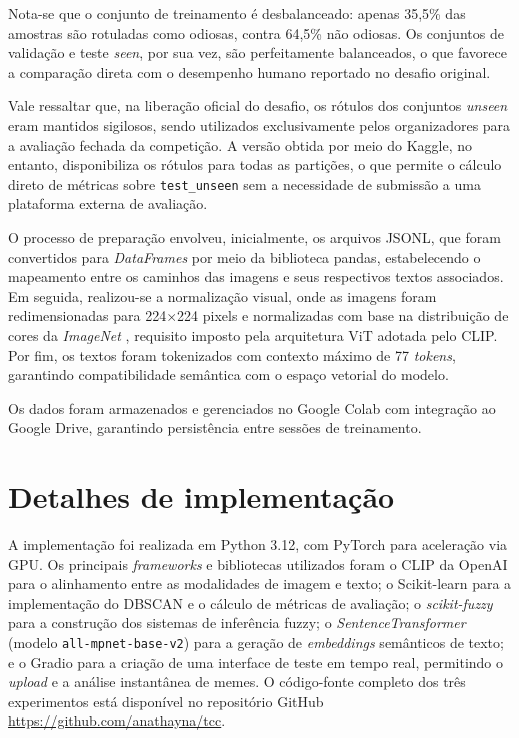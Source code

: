 Nota-se que o conjunto de treinamento é desbalanceado: apenas 35,5\% das amostras são rotuladas como odiosas, contra 64,5\% não odiosas. Os conjuntos de validação e teste \textit{seen}, por sua vez, são perfeitamente balanceados, o que favorece a comparação direta com o desempenho humano reportado no desafio original. 

Vale ressaltar que, na liberação oficial do desafio, os rótulos dos conjuntos 
\textit{unseen} eram mantidos sigilosos, sendo utilizados exclusivamente pelos 
organizadores para a avaliação fechada da competição. A 
versão obtida por meio do Kaggle, no entanto, disponibiliza os rótulos para todas 
as partições, o que permite o cálculo direto de métricas sobre \texttt{test\_unseen} 
sem a necessidade de submissão a uma plataforma externa de avaliação.

O processo de preparação envolveu, inicialmente, os arquivos JSONL, que foram convertidos para \textit{DataFrames} por meio da biblioteca pandas, estabelecendo o mapeamento entre os caminhos das imagens e seus respectivos textos associados. Em seguida, realizou-se a normalização visual, onde as imagens foram redimensionadas para 224$\times$224 pixels e normalizadas com base na distribuição de cores da \textit{ImageNet} \cite{deng2009imagenet}, requisito imposto pela arquitetura ViT adotada pelo CLIP. Por fim, os textos foram tokenizados com contexto máximo de 77 \textit{tokens}, garantindo compatibilidade semântica com o espaço vetorial do modelo.

Os dados foram armazenados e gerenciados no Google Colab com integração ao Google Drive, garantindo persistência entre sessões de treinamento.

\section{Detalhes de implementação}

A implementação foi realizada em Python 3.12, com PyTorch para aceleração via GPU. Os principais \textit{frameworks} e bibliotecas utilizados foram o CLIP da OpenAI para o alinhamento entre as modalidades de imagem e texto; o Scikit-learn para a implementação do DBSCAN e o cálculo de métricas de avaliação; o \textit{scikit-fuzzy} para a construção dos sistemas de inferência fuzzy; o \textit{SentenceTransformer} (modelo \texttt{all-mpnet-base-v2}) para a geração de \textit{embeddings} semânticos de texto; e o Gradio para a criação de uma interface de teste em tempo real, permitindo o \textit{upload} e a análise instantânea de memes. O código-fonte completo dos três experimentos está disponível no repositório GitHub \url{https://github.com/anathayna/tcc}.

